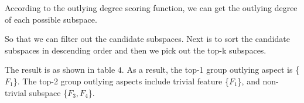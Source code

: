 \documentclass[
 size=14pt,
 paper=smartboard,  %
 mode=present, 		%
 display=slides, 	%
 style=tuliplab,  	%
 pauseslide,
 fleqn,leqno]{powerdot}
\begin{document}




\begin{note}
According to the outlying degree scoring function,
we can get the outlying degree of each possible subspace.

So that we can filter out the candidate subspaces.
Next is to sort the candidate subspaces in
descending order and then we pick out the top-k subspaces.

The result is as shown in table $4$.
As a result,
the top-1 group outlying aspect is \{$F_1$\}.
The top-2 group outlying aspects include
trivial feature \{$F_1$\},
and non-trivial subspace \{$F_3, F_4$\}.
\end{note}
\end{document}
